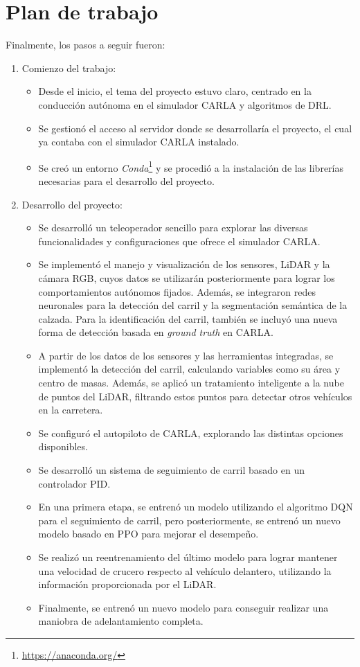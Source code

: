 \section{Plan de trabajo}
\label{sec:plantrabajo}

Finalmente, los pasos a seguir fueron:

\begin{enumerate}
\item Comienzo del trabajo:
\begin{itemize}
\item Desde el inicio, el tema del proyecto estuvo claro, centrado en la conducción autónoma en el simulador CARLA y algoritmos de \ac{DRL}.
\item Se gestionó el acceso al servidor donde se desarrollaría el proyecto, el cual ya contaba con el simulador CARLA instalado. 
\item Se creó un entorno \textit{Conda}\footnote{\url{https://anaconda.org/}} y se procedió a la instalación de las librerías necesarias para el desarrollo del proyecto.
\end{itemize}

\item Desarrollo del proyecto:
\begin{itemize}
\item Se desarrolló un teleoperador sencillo para explorar las diversas funcionalidades y configuraciones que ofrece el simulador CARLA.
\item Se implementó el manejo y visualización de los sensores, \ac{LiDAR} y la cámara RGB, cuyos datos se utilizarán posteriormente para lograr los comportamientos autónomos fijados. Además, se integraron redes neuronales para la detección del carril y la segmentación semántica de la calzada. Para la identificación del carril, también se incluyó una nueva forma de detección basada en \textit{ground truth} en CARLA. 
\item A partir de los datos de los sensores y las herramientas integradas, se implementó la detección del carril, calculando variables como su área y centro de masas. Además, se aplicó un tratamiento inteligente a la nube de puntos del \ac{LiDAR}, filtrando estos puntos para detectar otros vehículos en la carretera.
\item Se configuró el autopiloto de CARLA, explorando las distintas opciones disponibles.
\item Se desarrolló un sistema de seguimiento de carril basado en un controlador \ac{PID}.
\item En una primera etapa, se entrenó un modelo utilizando el algoritmo \ac{DQN} para el seguimiento de carril, pero posteriormente, se entrenó un nuevo modelo basado en \ac{PPO} para mejorar el desempeño.
\item Se realizó un reentrenamiento del último modelo para lograr mantener una velocidad de crucero respecto al vehículo delantero, utilizando la información proporcionada por el \ac{LiDAR}.
\item Finalmente, se entrenó un nuevo modelo para conseguir realizar una maniobra de adelantamiento completa.
\end{itemize}


\end{enumerate}
